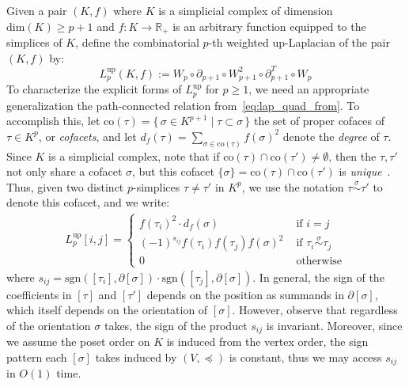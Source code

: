 \documentclass[10pt]{article}
\numberwithin{equation}{section}
\newcommand{\+}{%
	\raisebox{0.18ex}{\scaleobj{0.55}{+}}
}
\theoremstyle{definition}
\begin{document}
Given a pair $(K, f)$ where $K$ is a simplicial complex of dimension $\mathrm{dim}(K) \geq p+1$ and $f : K \to \mathbb{R}_+$ is an arbitrary function equipped to the simplices of $K$, define the combinatorial $p$-th weighted up-Laplacian of the pair $(K, f)$ by: 
$$ L_p^{\mathrm{up}}(K, f) := W_p \circ \partial_{p+1} \circ W_{p+1}^2 \circ \partial_{p+1}^T \circ W_p $$
To characterize the explicit forms of $L_p^{\mathrm{up}}$ for $p \geq 1$, we need an appropriate generalization the path-connected relation from~\eqref{eq:lap_quad_from}.
To accomplish this, let $\mathrm{co}(\tau) = \{ \, \sigma \in K^{p+1} \mid \tau \subset \sigma \, \}$ the set of proper cofaces of $\tau \in K^p$, or \emph{cofacets}, and let $d_f(\tau) = \sum_{\sigma \in \mathrm{co}(\tau)} f(\sigma)^2$ denote the \emph{degree} of $\tau$.
Since $K$ is a simplicial complex, note that if $\mathrm{co}(\tau) \cap \mathrm{co}(\tau') \neq \emptyset$, then the $\tau, \tau'$ not only share a cofacet $\sigma$, but this cofacet $\{\sigma\} = \mathrm{co}(\tau) \cap \mathrm{co}(\tau')$ is \emph{unique}~\cite{}. Thus, given two distinct $p$-simplices $\tau \neq \tau'$ in $K^p$, we use the notation $\tau \overset{\sigma}{\sim} \tau'$ to denote this cofacet, and we write:
\begin{align}\label{eq:up_laplace_ij}
	 L_p^{\text{up}}[i,j] = \begin{cases}
		f(\tau_i)^2 \cdot d_f(\sigma) & \text{ if } i = j \\ 
		(-1)^{s_{ij}} f(\tau_i)f(\tau_j)f(\sigma)^2 & \text{ if } \tau_i \overset{\sigma}{\sim} \tau_j \\
		0 & \text{ otherwise} 
	\end{cases}
\end{align}
where $s_{ij} = \mathrm{sgn}([\tau_i], \partial[\sigma]) \cdot \mathrm{sgn}([\tau_j], \partial[\sigma])$.
In general, the sign of the coefficients in $[\tau]$ and $[\tau']$ depends on the position as summands in $\partial[\sigma]$, which itself depends on the orientation of $[\sigma]$. However, observe that regardless of the orientation $\sigma$ takes, the sign of the product $s_{ij}$ is invariant. 
Moreover, since we assume the poset order on $K$ is induced from the vertex order, the sign pattern each $[\sigma]$ takes induced by $(V, \preceq)$ is constant, thus we may access $s_{ij}$ in $O(1)$ time.
\end{document}
